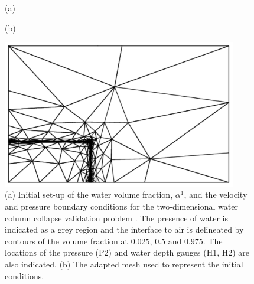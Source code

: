 \begin{figure}[tbp]
\hspace{1cm}(a)
\begin{center}

\end{center}
\hspace{1cm}(b)
\begin{center}
\includegraphics[width=10.2cm, trim=2.5cm 4.5cm 2.5cm 4.5cm, clip=true]{pictures/water_collapse_0_mesh.pdf}
\end{center}
\caption{(a) Initial set-up of the water volume fraction, $\alpha^1$, and the velocity and pressure boundary conditions for the two-dimensional water column collapse validation problem \citep{zhou_nonlinear_1999}. The presence of water is indicated as a grey region and the interface to air is delineated by contours of the volume fraction at $0.025$, $0.5$ and $0.975$.  The locations of the pressure (P2) and water depth gauges (H1, H2) are also indicated. (b) The adapted mesh used to represent the initial conditions.}
\label{fig:zhouinitial}
\end{figure}


